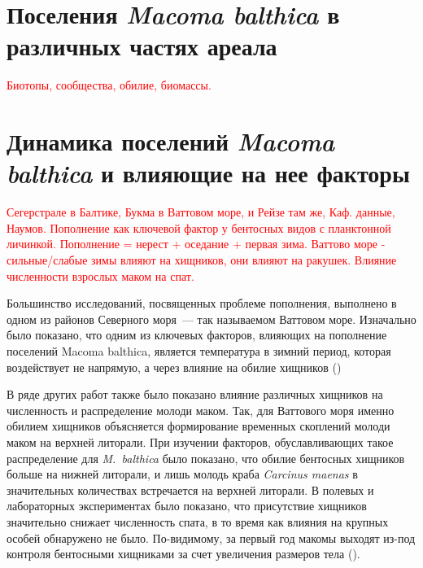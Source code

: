 

		\section{Поселения {\it Macoma balthica} в различных частях ареала}
\textcolor{red}{Биотопы, сообщества, обилие, биомассы.}

		\section{Динамика поселений {\it Macoma balthica} и влияющие на нее факторы}


\textcolor{red}{Сегерстрале в Балтике, Букма в Ваттовом море, и Рейзе там же, Каф. данные, Наумов.
Пополнение как ключевой фактор у бентосных видов с планктонной личинкой. 
Пополнение = нерест + оседание + первая зима.
Ваттово море - сильные/слабые зимы влияют на хищников, они влияют на ракушек. 
Влияние численности взрослых маком на спат.}

Большинство исследований, посвященных проблеме пополнения, выполнено в одном из районов Северного моря~--- так называемом Ваттовом море.	
Изначально было показано, что одним из ключевых факторов, влияющих на пополнение поселений Macoma balthica, является температура в зимний период, которая воздействует не напрямую, а через влияние на обилие хищников (\cite{Beukema_et_al_1998, Beukema_Dekker_2014, Dekker_Beukema_2014})

В ряде других работ также было показано влияние различных хищников на численность и распределение молоди маком. 
Так, для Ваттового моря именно обилием хищников объясняется формирование временных скоплений молоди маком на верхней литорали. 
При изучении факторов, обуславливающих такое распределение для \textit{M.~balthica} было показано, что обилие бентосных хищников больше на нижней литорали, и лишь молодь краба \textit{Carcinus maenas} в значительных количествах встречается на верхней литорали. 
В полевых и лабораторных экспериментах было показано, что присутствие хищников значительно снижает численность спата, в то время как влияния на крупных особей обнаружено не было. 
По-видимому, за первый год макомы выходят из-под контроля бентосными хищниками за счет увеличения размеров тела (\cite{Hiddink_et_al_2002_predation_epifauna}). 

